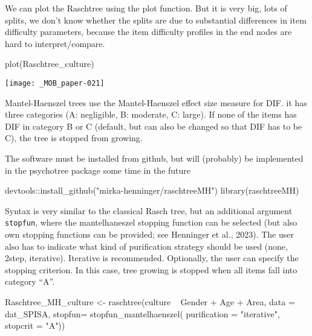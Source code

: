 \documentclass[doc,floatsintext,natbib]{apa7}
\begin{document}
We can plot the Raschtree using the plot function. But it is very big, lots of splits, we don't know whether the splits are due to substantial differences in item difficulty parameters, because the item difficulty profiles in the end nodes are hard to interpret/compare. 

\begin{Schunk}
\begin{Sinput}
 plot(Raschtree_culture)
\end{Sinput}
\end{Schunk}
\texttt{[image: \_MOB\_paper-021]}


Mantel-Haenszel trees use the Mantel-Haenszel effect size measure for DIF. it has three categories (A: negligible, B: moderate, C: large). If none of the items has DIF in category B or C (default, but can also be changed so that DIF has to be C), the tree is stopped from growing. 

The software must be installed from github, but will (probably) be implemented in the psychotree package some time in the future

\begin{Schunk}
\begin{Sinput}
 devtools::install_github("mirka-henninger/raschtreeMH")
 library(raschtreeMH)
\end{Sinput}
\end{Schunk}

Syntax is very similar to the classical Rasch tree, but an additional argument \texttt{stopfun}, where the mantelhaneszel stopping function can be selected (but also own stopping functions can be provided; see Henninger et al., 2023). The user also has to indicate what kind of purification strategy should be used (none, 2step, iterative). Iterative is recommended. Optionally, the user can specify the stopping criterion. In this case, tree growing is stopped when all items fall into category ``A''. 


\begin{Schunk}
\begin{Sinput}
 Raschtree_MH_culture <- raschtree(culture ~  Gender + Age + Area, 
                                   data = dat_SPISA, 
                                   stopfun= stopfun_mantelhaenszel(
                                     purification = "iterative",
                                     stopcrit = "A"))
\end{Sinput}
\end{Schunk}
\end{document}

